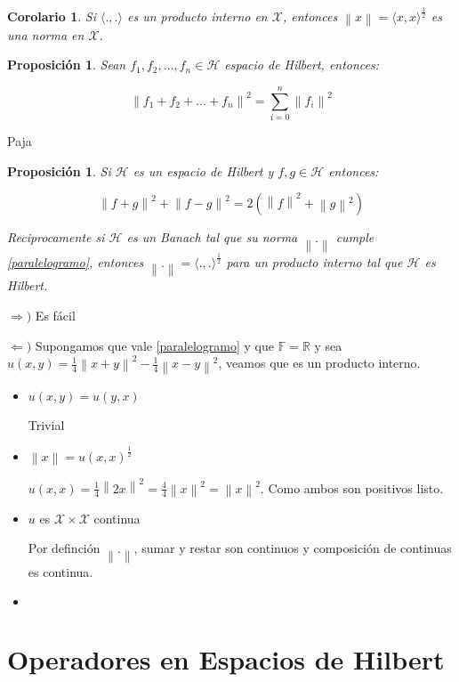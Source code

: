 \documentclass[11pt]{article}
\newcommand{\Hil}{\mathcal{H}}
\newcommand{\X}{\mathcal{X}}
\newcommand{\f}{\mathbb{F}}
\newcommand{\R}{{\mathbb{R}}}
\newcommand\norm[1]{\left\lVert#1\right\rVert}
\newcommand{\prodint}[1]{\langle #1 \rangle}
\newtheorem{proposition}[theorem]{Proposici\'on}
\newtheorem{corollary}[theorem]{Corolario}
\newenvironment{proof}[1][Demostraci\'on]{\begin{trivlist}
\item[\hskip \labelsep {\bfseries #1}]}{\end{trivlist}}
\newcommand{\qed}{\nobreak \ifvmode \relax \else
      \ifdim\lastskip<1.5em \hskip-\lastskip
      \hskip1.5em plus0em minus0.5em \fi \nobreak
      \vrule height0.75em width0.5em depth0.25em\fi}
\begin{document}
\begin{corollary}
Si $\prodint{.,.}$ es un producto interno en $\X$, entonces $\norm{x} = \prodint{x,x}^{\frac{1}{2}}$ es una norma en $\X$.
\end{corollary}

\begin{proposition}
Sean $f_1,f_2,...,f_n \in \Hil$ espacio de Hilbert, entonces:
 
$$\norm{f_1+f_2 + ... + f_n} ^2 = \sum_{i=0}^{n}{\norm{f_i}^2}$$
 
\end{proposition}

\begin{proof}
Paja \qed
\end{proof}

\begin{proposition}
Si $\Hil$ es un espacio de Hilbert y $f,g \in \Hil$ entonces:

\begin{equation}\label{paralelogramo}
\norm{f+g}^2 + \norm{f-g}^2 = 2 (\norm{f} ^2 + \norm {g} ^2)
\end{equation}

Reciprocamente si $\Hil$ es un Banach tal que su norma $\norm{.}$ cumple \ref{paralelogramo}, entonces $\norm{.} = \prodint{.,.}^{\frac{1}{2}}$ para un producto interno tal que $\Hil$ es Hilbert.

\end{proposition}

\begin{proof}

$\Longrightarrow)$ Es f\'acil

$\Longleftarrow)$ Supongamos que vale \ref{paralelogramo} y que $\f = \R $ y sea $u(x,y)= \frac{1}{4} \norm{x+y}^2 - \frac{1}{4} \norm{x-y}^2$, veamos que es un producto interno.

\begin{itemize}

\item $u(x,y)=u(y,x)$

Trivial

\item $\norm{x}=u(x,x)^{\frac{1}{2}}$

$u(x,x) = \frac{1}{4} \norm{2x}^{2} = \frac{4}{4} \norm{x}^2 = \norm{x}^2$. Como ambos son positivos listo.

\item $u$ es $\X \times \X$ continua

Por definci\'on $\norm{.}$, sumar y restar son continuos y composici\'on de continuas es continua.

\item  $$

\end{itemize}
\end{proof}


\chapter{Operadores en Espacios de Hilbert}
\end{document}
